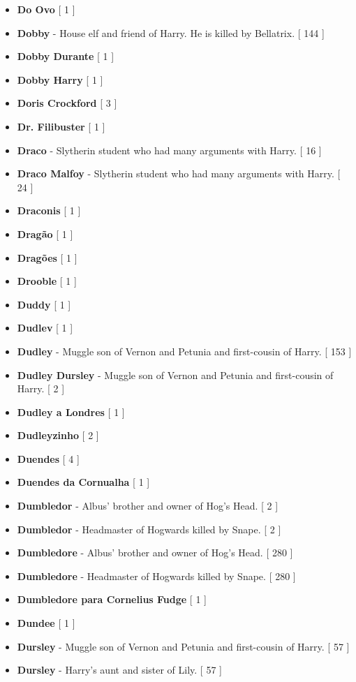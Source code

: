 \documentclass[a4paper]{article}
\begin{document}
{\begin{itemize}
	\item \textbf{Do Ovo} [ 1 ]
	\item \textbf{Dobby} - House elf and friend of Harry. He is killed by Bellatrix. [ 144 ]
	\item \textbf{Dobby Durante} [ 1 ]
	\item \textbf{Dobby Harry} [ 1 ]
	\item \textbf{Doris Crockford} [ 3 ]
	\item \textbf{Dr. Filibuster} [ 1 ]
	\item \textbf{Draco} - Slytherin student who had many arguments with Harry. [ 16 ]
	\item \textbf{Draco Malfoy} - Slytherin student who had many arguments with Harry. [ 24 ]
	\item \textbf{Draconis} [ 1 ]
	\item \textbf{Dragão} [ 1 ]
	\item \textbf{Dragões} [ 1 ]
	\item \textbf{Drooble} [ 1 ]
	\item \textbf{Duddy} [ 1 ]
	\item \textbf{Dudlev} [ 1 ]
	\item \textbf{Dudley} - Muggle son of Vernon and Petunia and first-cousin of Harry. [ 153 ]
	\item \textbf{Dudley Dursley} - Muggle son of Vernon and Petunia and first-cousin of Harry. [ 2 ]
	\item \textbf{Dudley a Londres} [ 1 ]
	\item \textbf{Dudleyzinho} [ 2 ]
	\item \textbf{Duendes} [ 4 ]
	\item \textbf{Duendes da Cornualha} [ 1 ]
	\item \textbf{Dumbledor} - Albus' brother and owner of Hog's Head. [ 2 ]
	\item \textbf{Dumbledor} - Headmaster of Hogwards killed by Snape. [ 2 ]
	\item \textbf{Dumbledore} - Albus' brother and owner of Hog's Head. [ 280 ]
	\item \textbf{Dumbledore} - Headmaster of Hogwards killed by Snape. [ 280 ]
	\item \textbf{Dumbledore para Cornelius Fudge} [ 1 ]
	\item \textbf{Dundee} [ 1 ]
	\item \textbf{Dursley} - Muggle son of Vernon and Petunia and first-cousin of Harry. [ 57 ]
	\item \textbf{Dursley} - Harry's aunt and sister of Lily. [ 57 ]

\end{itemize}}
\end{document}
